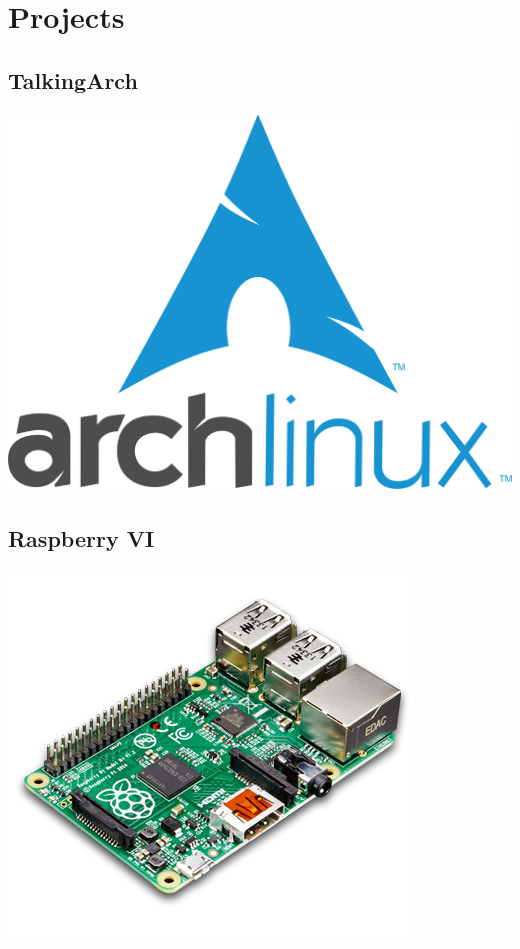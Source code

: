 \documentclass[11pt]{article}
\begin{document}
\section*{Projects}
\label{sec:orgheadline16}
\subsection*{TalkingArch}
\label{sec:orgheadline8}
\includegraphics[width=.9\linewidth]{./images/arch.png}
\subsection*{Raspberry VI}
\label{sec:orgheadline9}
\includegraphics[width=.9\linewidth]{./images/pi.png}
\end{document}
